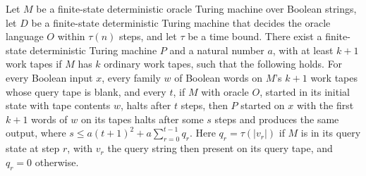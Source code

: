 \begin{theorem}
\label{Turing.FinOracleTM.exists_plain_simulation}
\leanok
{}
Let $M$ be a finite-state deterministic oracle Turing machine over Boolean strings, let
$D$ be a finite-state deterministic Turing machine that decides the oracle language $O$
within $\tau(n)$ steps, and let $\tau$ be a time bound. There exist a finite-state
deterministic Turing machine $P$ and a natural number $a$, with at least $k+1$ work
tapes if $M$ has $k$ ordinary work tapes, such that the following holds. For every
Boolean input $x$, every family $w$ of Boolean words on $M$'s $k+1$ work tapes whose
query tape is blank, and every $t$, if $M$ with oracle $O$, started in its initial state
with tape contents $w$, halts after $t$ steps, then $P$ started on $x$ with the first
$k+1$ words of $w$ on its tapes halts after some $s$ steps and produces the same output,
where $s\le a(t+1)^2+a\sum_{r=0}^{t-1} q_r$. Here $q_r=\tau(|v_r|)$ if $M$ is in its
query state at step $r$, with $v_r$ the query string then present on its query tape, and
$q_r=0$ otherwise.
\end{theorem}

